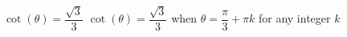 {$\cot(\theta) = \dfrac{\sqrt{3}}{3}$}
{$\cot(\theta) = \dfrac{\sqrt{3}}{3}$ when $\theta = \dfrac{\pi}{3} + \pi k$ for any integer $k$}
